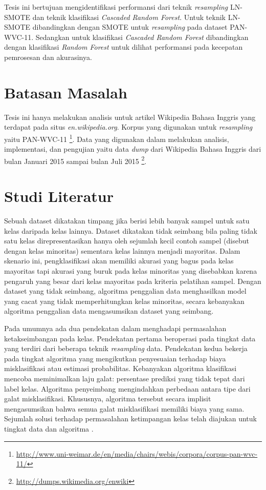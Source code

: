 Tesis ini bertujuan mengidentifikasi performansi dari teknik \textit{resampling} LN-SMOTE dan teknik klasifikasi \textit{Cascaded Random Forest}.
Untuk teknik LN-SMOTE dibandingkan dengan SMOTE untuk \textit{resampling} pada dataset PAN-WVC-11.
Sedangkan untuk klasifikasi \textit{Cascaded Random Forest} dibandingkan dengan klasifikasi \textit{Random Forest} untuk dilihat performansi pada kecepatan pemrosesan dan akurasinya.

\section{Batasan Masalah}\label{sec:batasan-masalah}

Tesis ini hanya melakukan analisis untuk artikel Wikipedia Bahasa Inggris yang terdapat pada situs \textit{en.wikipedia.org}.
Korpus yang digunakan untuk \textit{resampling} yaitu PAN-WVC-11 \footnote{\RaggedRight\url{http://www.uni-weimar.de/en/media/chairs/webis/corpora/corpus-pan-wvc-11/}}.
Data yang digunakan dalam melakukan analisis, implementasi, dan pengujian yaitu data \textit{dump} dari Wikipedia Bahasa Inggris dari bulan Januari 2015 sampai bulan Juli 2015
\footnote{\url{http://dumps.wikimedia.org/enwiki}}.

\section{Studi Literatur}\label{sec:studi-literatur}

Sebuah dataset dikatakan timpang jika berisi lebih banyak sampel untuk satu kelas daripada kelas lainnya.
Dataset dikatakan tidak seimbang bila paling tidak satu kelas direpresentasikan hanya oleh sejumlah kecil contoh sampel (disebut dengan kelas minoritas) sementara kelas lainnya menjadi mayoritas.
Dalam skenario ini, pengklasifikasi akan memiliki akurasi yang bagus pada kelas mayoritas tapi akurasi yang buruk pada kelas minoritas yang disebabkan karena pengaruh yang besar dari kelas mayoritas pada kriteria pelatihan sampel.
Dengan dataset yang tidak seimbang, algoritma penggalian data menghasilkan model yang cacat yang tidak memperhitungkan kelas minoritas, secara kebanyakan algoritma penggalian data mengasumsikan dataset yang seimbang.

Pada umumnya ada dua pendekatan dalam menghadapi permasalahan ketakseimbangan pada kelas.
Pendekatan pertama beroperasi pada tingkat data yang terdiri dari beberapa teknik \textit{resampling} data.
Pendekatan kedua bekerja pada tingkat algoritma yang mengikutkan penyesuaian terhadap biaya misklasifikasi atau estimasi probabilitas.
Kebanyakan algoritma klasifikasi mencoba meminimalkan laju galat: persentase prediksi yang tidak tepat dari label kelas.
Algoritma penyeimbang mengindahkan perbedaan antara tipe dari galat misklasifikasi.
Khususnya, algoritma tersebut secara implisit mengasumsikan bahwa semua galat misklasifikasi memiliki biaya yang sama.
Sejumlah solusi terhadap permasalahan ketimpangan kelas telah diajukan untuk tingkat data dan algoritma \cite{chawla2004editorial}.


